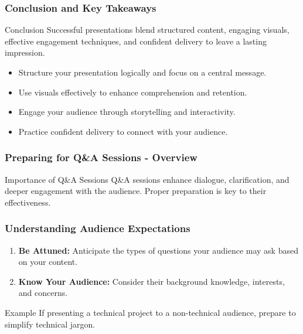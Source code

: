 \documentclass[aspectratio=169]{beamer}
\begin{document}
\begin{frame}[fragile]
    \frametitle{Conclusion and Key Takeaways}
    \begin{block}{Conclusion}
        Successful presentations blend structured content, engaging visuals, effective engagement techniques, and confident delivery to leave a lasting impression.
    \end{block}
    \begin{itemize}
        \item Structure your presentation logically and focus on a central message.
        \item Use visuals effectively to enhance comprehension and retention.
        \item Engage your audience through storytelling and interactivity.
        \item Practice confident delivery to connect with your audience.
    \end{itemize}
\end{frame}

\begin{frame}[fragile]
    \frametitle{Preparing for Q\&A Sessions - Overview}
    \begin{block}{Importance of Q\&A Sessions}
        Q\&A sessions enhance dialogue, clarification, and deeper engagement with the audience. Proper preparation is key to their effectiveness.
    \end{block}
\end{frame}

\begin{frame}[fragile]
    \frametitle{Understanding Audience Expectations}
    \begin{enumerate}
        \item \textbf{Be Attuned:} Anticipate the types of questions your audience may ask based on your content.
        \item \textbf{Know Your Audience:} Consider their background knowledge, interests, and concerns.
    \end{enumerate}
    \begin{block}{Example}
        If presenting a technical project to a non-technical audience, prepare to simplify technical jargon.
    \end{block}
\end{frame}
\end{document}
